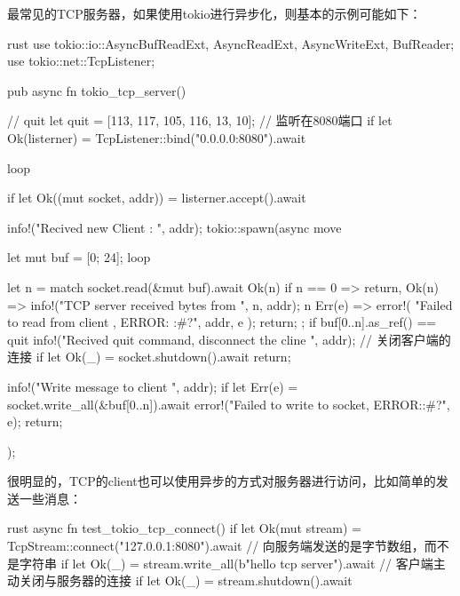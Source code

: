 最常见的TCP服务器，如果使用tokio进行异步化，则基本的示例可能如下：
\begin{code-block}{rust}
use tokio::io::{AsyncBufReadExt, AsyncReadExt, AsyncWriteExt, BufReader};
use tokio::net::TcpListener;

pub async fn tokio_tcp_server() {
    // quit\n{}
    let quit = [113, 117, 105, 116, 13, 10];
    // 监听在8080端口
    if let Ok(listerner) = TcpListener::bind("0.0.0.0:8080").await {
        loop {
            if let Ok((mut socket, addr)) = listerner.accept().await {
                info!("Recived new Client : {}", addr);
                tokio::spawn(async move {
                    let mut buf = [0; 24];
                    loop {
                        let n = match socket.read(&mut buf).await {
                            Ok(n) if n == 0 => return,
                            Ok(n) => {
                                info!("TCP server received {} bytes from {}",
                                    n, addr);
                                n
                            }
                            Err(e) => {
                                error!(
                                    "Failed to read from client {} , ERROR: {:#?}",
                                    addr, e
                                );
                                return;
                            }
                        };
                        if buf[0..n].as_ref() == quit {
                            info!("Recived quit command, disconnect the cline {}",
                                addr);
                            // 关闭客户端的连接
                            if let Ok(_) = socket.shutdown().await {}
                            return;
                        }

                        info!("Write message to client {}", addr);
                        if let Err(e) = socket.write_all(&buf[0..n]).await {
                            error!("Failed to write to socket, ERROR:{:#?}", e);
                            return;
                        }
                    }
                });
            }
        }
    }
}
\end{code-block}

很明显的，TCP的client也可以使用异步的方式对服务器进行访问，比如简单的发送一些消息：
\begin{code-block}{rust}
async fn test_tokio_tcp_connect() {
    if let Ok(mut stream) = TcpStream::connect("127.0.0.1:8080").await {
        // 向服务端发送的是字节数组，而不是字符串
        if let Ok(_) = stream.write_all(b"hello tcp server").await {
            // 客户端主动关闭与服务器的连接
            if let Ok(_) = stream.shutdown().await {}
        }
    }
}
\end{code-block}

